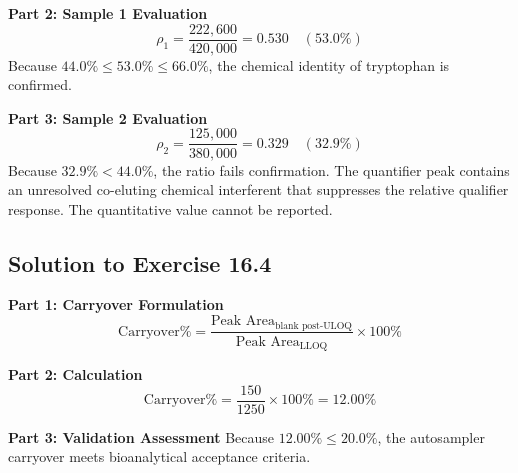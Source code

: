 \documentclass[11pt,twoside,openright]{book}
\begin{document}
\noindent\textbf{Part 2: Sample 1 Evaluation}\enspace
\begin{equation*}
\rho_1 = \frac{222,600}{420,000} = 0.530 \quad (53.0\%)
\end{equation*}
Because $44.0\% \le 53.0\% \le 66.0\%$, the chemical identity of tryptophan is confirmed.

\noindent\textbf{Part 3: Sample 2 Evaluation}\enspace
\begin{equation*}
\rho_2 = \frac{125,000}{380,000} = 0.329 \quad (32.9\%)
\end{equation*}
Because $32.9\% < 44.0\%$, the ratio fails confirmation. The quantifier peak contains an unresolved co-eluting chemical interferent that suppresses the relative qualifier response. The quantitative value cannot be reported.

\subsection{Solution to Exercise 16.4}

\noindent\textbf{Part 1: Carryover Formulation}\enspace
\begin{equation*}
\text{Carryover}\% = \frac{\text{Peak Area}_{\text{blank post-ULOQ}}}{\text{Peak Area}_{\text{LLOQ}}} \times 100\%
\end{equation*}

\noindent\textbf{Part 2: Calculation}\enspace
\begin{equation*}
\text{Carryover}\% = \frac{150}{1250} \times 100\% = 12.00\%
\end{equation*}

\noindent\textbf{Part 3: Validation Assessment}\enspace
Because $12.00\% \le 20.0\%$, the autosampler carryover meets bioanalytical acceptance criteria.

\end{document}

